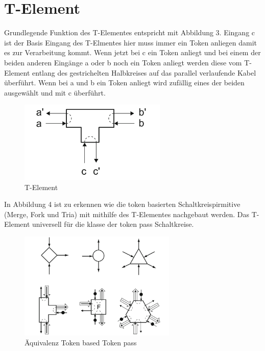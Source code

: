 \section{T-Element}
Grundlegende Funktion des T-Elementes entspricht mit Abbildung 3.
%
Eingang c ist der Basis Eingang des T-Elmentes hier muss immer ein Token
anliegen damit es zur Verarbeitung kommt.
%
Wenn jetzt bei c ein Token anliegt und bei einem der beiden anderen
Eingänge a oder b noch ein Token anliegt werden diese vom T-Element 
entlang des gestrichelten Halbkreises auf das parallel verlaufende 
Kabel überführt.
%
Wenn bei a und b ein Token anliegt wird zufällig 
eines der beiden ausgewählt und mit c überführt.

\begin{figure}[h]
    \centering
    \includegraphics[width=7cm]{bilder/T_Element.png}
    \caption{T-Element}
\end{figure}    

In Abbildung 4 ist zu erkennen wie die token basierten Schaltkreispirmitive 
(Merge, Fork und Tria) mit mithilfe des T-Elementes nachgebaut werden.
%
Das T-Element universell für die klasse der token pass 
Schaltkreise.

\begin{figure}[h]
    \centering 
    \centering
    \includegraphics[width=7.5cm]{bilder/BasedToPass.png}
    \caption{Äquivalenz Token based Token pass}
\end{figure}


